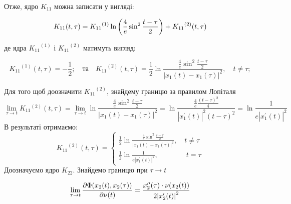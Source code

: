 \documentclass[14pt,a4paper]{extarticle}
\newcounter{e}
\numberwithin{equation}{section}
\begin{document}
Отже, ядро $K_{11}$ можна записати у вигляді:


$$
	\displaystyle
	K_{11}(t, \tau) = {K_{11}}^{(1)} \ln \left(\frac{4}{e} \sin ^{2}  \frac{t-\tau}{2}\right)+{K_{11}}^{(2)}(t, \tau) \\
$$

де ядра ${K_{11}}^{(1)}$ і ${K_{11}}^{(2)}$ матимуть вигляд:

$$
	\displaystyle
	{K_{11}}^{(1)}(t, \tau) =-\frac{1}{2};
	\displaystyle
	\quad \text{та} \quad
	\displaystyle
	{K_{11}}^{(2)}(t, \tau) =\frac{1}{2} \ln{\frac{\frac{4}{e} \sin ^{2} \frac{t-\tau}{2}}{\left|x_{1}(t)-x_{1}(\tau)\right|^{2}}}, \quad t \neq \tau;
$$

Для того щоб доозначити ${K_{11}}^{(2)}$, знайдему границю за правилом Лопіталя
$$
\lim _{\tau \rightarrow t} K_{11}{ }^{(2)}(t, \tau) = \lim _{\tau \rightarrow t} \ln \frac{\frac{4}{e} \sin ^{2} \frac{t-\tau}{2}}{\left|x_{1}(t)-x_{1}(\tau)\right|^{2}}=\ln \frac{\frac{4}{e} \frac{(t-\tau)^{2}}{4}}{\left|x_{1}^{\prime}(t)\right|^{2}(t-\tau)^{2}}=\ln \frac{1}{e\left|x_{1}^{\prime}(t)\right|^{2}}
$$
В результаті отримаємо:
$$
{K_{11}}^{(2)}(t, \tau) =
\left\{
\begin{array}{l}
	\displaystyle
	\frac{1}{2} \ln{\frac{\frac{4}{e} \sin ^{2} \frac{t-\tau}{2}}{\left|x_{1}(t)-x_{1}(\tau)\right|^{2}}}
	,\quad t \neq \tau
	\\ [1cm]
	
	\displaystyle
	\frac{1}{2} \ln \frac{1}{e\left|x_{1}^{\prime}(t)\right|^{2}}
	,\quad  \quad  \quad  \quad   t = \tau
\end{array}
\right.
$$
Доозначуємо ядро $K_{22}$. Знайдемо границю при $\tau \rightarrow t$

$$
\lim_{\tau \rightarrow t } \pdv{\Phi(x_{2}(t), x_{2}(\tau))}{\nu(t)} =
\frac{  x''_{2}(\tau) \cdot \nu (x_2(t)) }{ 2\abs{ x'_{2}(t)}^2 } 
$$
\end{document}
